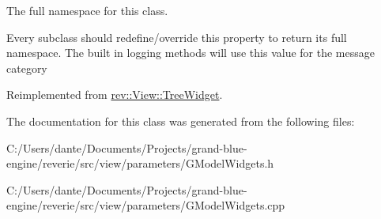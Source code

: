 The full namespace for this class. 

Every subclass should redefine/override this property to return its full namespace. The built in logging methods will use this value for the message category 

Reimplemented from \mbox{\hyperlink{classrev_1_1_view_1_1_tree_widget_a09be824e34e50e9622c3dc333c9a3c07}{rev\+::\+View\+::\+Tree\+Widget}}.



The documentation for this class was generated from the following files\+:\begin{DoxyCompactItemize}
\item 
C\+:/\+Users/dante/\+Documents/\+Projects/grand-\/blue-\/engine/reverie/src/view/parameters/G\+Model\+Widgets.\+h\item 
C\+:/\+Users/dante/\+Documents/\+Projects/grand-\/blue-\/engine/reverie/src/view/parameters/G\+Model\+Widgets.\+cpp\end{DoxyCompactItemize}
